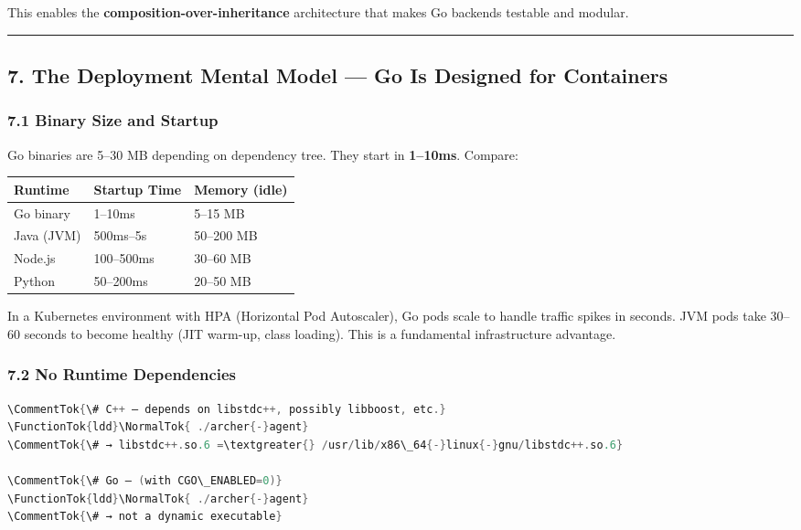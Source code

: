 \documentclass[11pt,openany]{book}
\newcommand{\CommentTok}[1]{\textcolor[rgb]{0.38,0.63,0.69}{\textit{#1}}}
\newcommand{\FunctionTok}[1]{\textcolor[rgb]{0.02,0.16,0.49}{#1}}
\newcommand{\NormalTok}[1]{#1}
\begin{document}
This enables the \textbf{composition-over-inheritance} architecture that
makes Go backends testable and modular.

\begin{center}\rule{0.5\linewidth}{0.5pt}\end{center}

\hypertarget{the-deployment-mental-model-go-is-designed-for-containers}{%
\subsection{7. The Deployment Mental Model --- Go Is Designed for
Containers}\label{the-deployment-mental-model-go-is-designed-for-containers}}

\hypertarget{binary-size-and-startup}{%
\subsubsection{7.1 Binary Size and
Startup}\label{binary-size-and-startup}}

Go binaries are 5--30 MB depending on dependency tree. They start in
\textbf{1--10ms}. Compare:

\begin{longtable}[]{@{}lll@{}}
\toprule()
Runtime & Startup Time & Memory (idle) \\
\midrule()
\endhead
Go binary & 1--10ms & 5--15 MB \\
Java (JVM) & 500ms--5s & 50--200 MB \\
Node.js & 100--500ms & 30--60 MB \\
Python & 50--200ms & 20--50 MB \\
\bottomrule()
\end{longtable}

In a Kubernetes environment with HPA (Horizontal Pod Autoscaler), Go
pods scale to handle traffic spikes in seconds. JVM pods take 30--60
seconds to become healthy (JIT warm-up, class loading). This is a
fundamental infrastructure advantage.

\hypertarget{no-runtime-dependencies}{%
\subsubsection{7.2 No Runtime
Dependencies}\label{no-runtime-dependencies}}

\begin{lstlisting}[language=Go]
\CommentTok{\# C++ — depends on libstdc++, possibly libboost, etc.}
\FunctionTok{ldd}\NormalTok{ ./archer{-}agent}
\CommentTok{\# → libstdc++.so.6 =\textgreater{} /usr/lib/x86\_64{-}linux{-}gnu/libstdc++.so.6}

\CommentTok{\# Go — (with CGO\_ENABLED=0)}
\FunctionTok{ldd}\NormalTok{ ./archer{-}agent}
\CommentTok{\# → not a dynamic executable}
\end{lstlisting}
\end{document}
